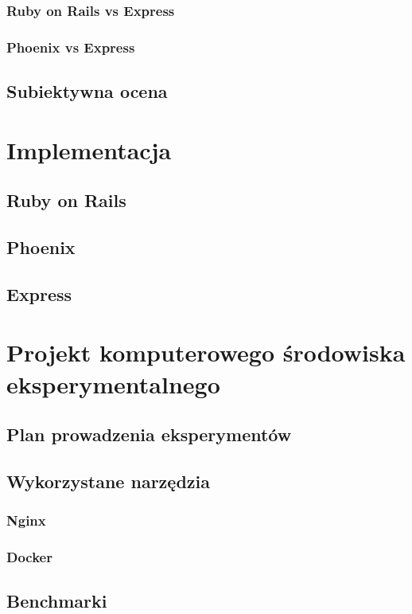 \documentclass[mgr,oneside]{mgr}
\begin{document}
\subsection{Ruby on Rails vs Express}
\subsection{Phoenix vs Express}
\section{Subiektywna ocena}

\chapter{Implementacja}
\section{Ruby on Rails}
\section{Phoenix}
\section{Express}

\chapter{Projekt komputerowego środowiska eksperymentalnego}
\section{Plan prowadzenia eksperymentów}

\section{Wykorzystane narzędzia}
\subsection{Nginx}
\subsection{Docker}
\section{Benchmarki}
\end{document}
